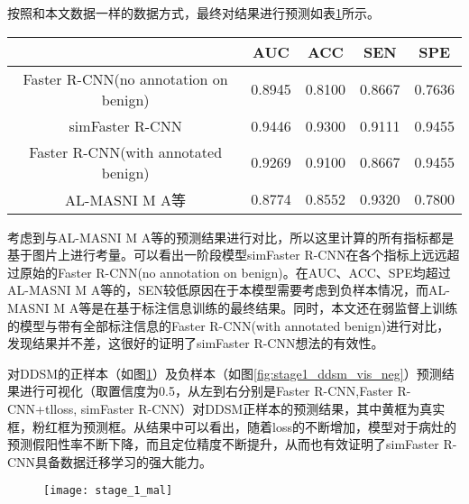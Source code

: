按照和本文数据一样的数据方式，最终对结果进行预测如表\ref{tab:1_stage_ddsm_pred_result}所示。
\begin{table}[!htbp]
    \label{tab:1_stage_ddsm_pred_result}
    \centering
    \footnotesize%
    \setlength{\tabcolsep}{4pt}%
    \renewcommand{\arraystretch}{1.2}%
    \begin{tabular}{ccccc}
        \hline
        &AUC& ACC &SEN &SPE \\
        \hline
        Faster R-CNN(no annotation on benign) &0.8945 &0.8100 &0.8667 &0.7636\\
       	simFaster R-CNN &0.9446 &0.9300 &0.9111  &0.9455  \\
       	Faster R-CNN(with annotated benign) &0.9269 &0.9100 &0.8667  &0.9455  \\
       	AL-MASNI M A等\cite{al2017detection} &0.8774 &0.8552 &0.9320  &0.7800  \\
        \hline
    \end{tabular}
\end{table}

考虑到与AL-MASNI M A等\cite{al2017detection}的预测结果进行对比，所以这里计算的所有指标都是基于图片上进行考量。可以看出一阶段模型simFaster R-CNN在各个指标上远远超过原始的Faster R-CNN(no annotation on benign)。在AUC、ACC、SPE均超过AL-MASNI M A等\cite{al2017detection}的，SEN较低原因在于本模型需要考虑到负样本情况，而AL-MASNI M A等\cite{al2017detection}是在基于标注信息训练的最终结果。同时，本文还在弱监督上训练的模型与带有全部标注信息的Faster R-CNN(with annotated benign)进行对比，发现结果并不差，这很好的证明了simFaster R-CNN想法的有效性。

对DDSM的正样本（如图\ref{fig:stage1_ddsm_vis}）及负样本（如图\ref{fig:stage1_ddsm_vis_neg}）预测结果进行可视化（取置信度为0.5，从左到右分别是Faster R-CNN,Faster R-CNN+tlloss, simFaster R-CNN）对DDSM正样本的预测结果，其中黄框为真实框，粉红框为预测框。从结果中可以看出，随着loss的不断增加，模型对于病灶的预测假阳性率不断下降，而且定位精度不断提升，从而也有效证明了simFaster R-CNN具备数据迁移学习的强大能力。
		\begin{figure}[!htbp]
    \centering
    \texttt{[image: stage\_1\_mal]}
    \label{fig:stage1_ddsm_vis}
	\end{figure}
	
